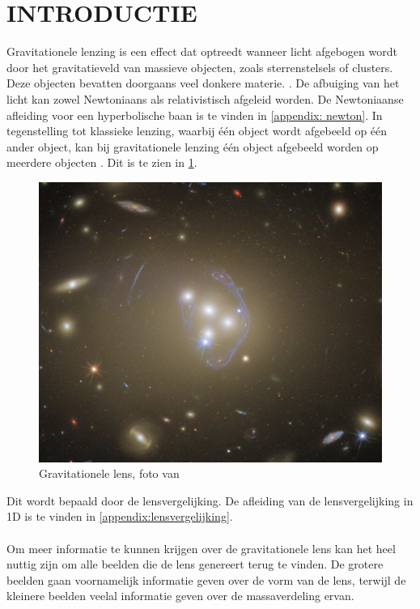 \section{INTRODUCTIE}
Gravitationele lenzing is een effect dat optreedt wanneer licht afgebogen wordt door het gravitatieveld van massieve objecten, zoals sterrenstelsels of clusters. Deze objecten bevatten doorgaans veel donkere materie. \cite{informationesoorg-no-date}. De afbuiging van het licht kan zowel Newtoniaans als relativistisch afgeleid worden. De Newtoniaanse afleiding voor een hyperbolische baan is te vinden in \cref{appendix: newton}. In tegenstelling tot klassieke lenzing, waarbij één object wordt afgebeeld op één ander object, kan bij gravitationele lenzing één object afgebeeld worden op meerdere objecten \cite{unknown-author-2022}. Dit is te zien in \cref{fig:grav lens}. 
\begin{figure}
    \centering
    \includegraphics[width=0.95\linewidth]{Figures/gravitationele_lens.png}
    \caption{Gravitationele lens, foto van \cite{unknown-author-no-date-gravlens}}
    \label{fig:grav lens}
\end{figure}
Dit wordt bepaald door de lensvergelijking. De afleiding van de lensvergelijking in 1D is te vinden in \cref{appendix:lensvergelijking}.\\ \\
Om meer informatie te kunnen krijgen over de gravitationele lens kan het heel nuttig zijn om alle beelden die de lens genereert terug te vinden. De grotere beelden gaan voornamelijk informatie geven over de vorm van de lens, terwijl de kleinere beelden veelal informatie geven over de massaverdeling ervan. \\ \\
